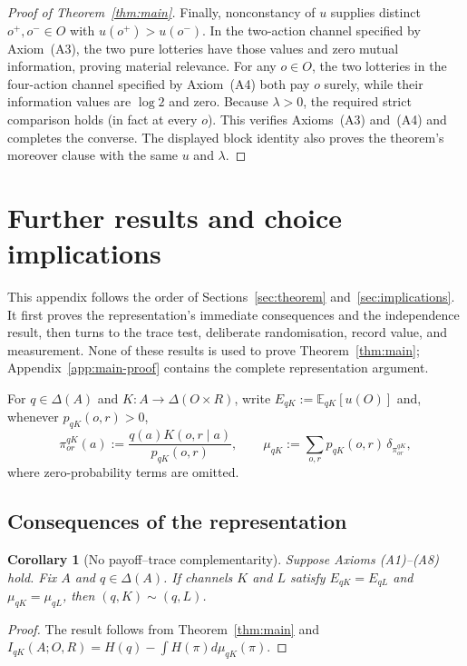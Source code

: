 \documentclass[11pt,a4paper]{article}
\newtheorem{corollary}[theorem]{Corollary}
\theoremstyle{definition}
\newcommand{\D}{\Delta}
\newcommand{\E}{\mathbb E}
\newcommand{\I}{I}
\newcommand{\Sh}{H}
\newcommand{\1}{\mathbf 1}
\begin{document}
\begin{proof}[Proof of Theorem~\ref{thm:main}]
Finally, nonconstancy of $u$ supplies distinct $o^+,o^-\in O$ with
$u(o^+)>u(o^-)$.  In the two-action channel specified by
Axiom~\textup{(A3)}, the two pure lotteries have those values and zero mutual
information, proving material relevance.  For any $o\in O$, the two lotteries
in the four-action channel specified by Axiom~\textup{(A4)} both pay $o$
surely, while their information values are $\log2$ and zero.  Because
$\lambda>0$, the required strict comparison holds (in fact at every $o$).
This verifies Axioms~\textup{(A3)} and~\textup{(A4)} and completes the
converse.  The displayed block identity also proves the theorem's moreover
clause with the same $u$ and $\lambda$.
\end{proof}
\clearpage
\section{Further results and choice implications}\label{app:auxiliary-results}

This appendix follows the order of Sections~\ref{sec:theorem}
and~\ref{sec:implications}.  It first proves the representation's immediate
consequences and the independence result, then turns to the trace test,
deliberate randomisation, record value, and measurement.  None of these
results is used to prove Theorem~\ref{thm:main}; Appendix~\ref{app:main-proof}
contains the complete representation argument.

For $q\in\D(A)$ and $K:A\to\D(O\times R)$, write
$E_{qK}:=\E_{qK}[u(O)]$ and, whenever $p_{qK}(o,r)>0$,
\[
 \pi^{qK}_{or}(a):=\frac{q(a)K(o,r\mid a)}{p_{qK}(o,r)},
 \qquad
 \mu_{qK}:=\sum_{o,r}p_{qK}(o,r)\,\delta_{\pi^{qK}_{or}},
\]
where zero-probability terms are omitted.

\subsection{Consequences of the representation}
\label{app:representation-consequences}

\begin{corollary}[No payoff--trace complementarity]\label{cor:matching}
Suppose Axioms \textup{(A1)--(A8)} hold.  Fix $A$ and $q\in\D(A)$.  If channels $K$ and $L$ satisfy
$E_{qK}=E_{qL}$ and $\mu_{qK}=\mu_{qL}$, then $(q,K)\sim(q,L)$.
\end{corollary}

\begin{proof}
The result follows from Theorem~\ref{thm:main} and
$\I_{qK}(A;O,R)=\Sh(q)-\int\Sh(\pi)d\mu_{qK}(\pi)$.
\end{proof}
\end{document}
